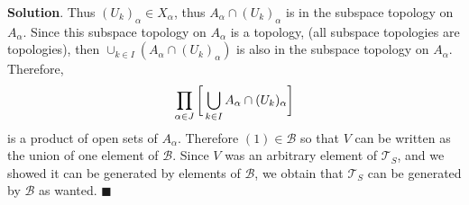 \documentclass[12pt]{article}
\renewcommand{\=}[1]{\stackrel{#1}{=}} %
\providecommand{\T}{\mathcal{T}}
\theoremstyle{definition}
\newenvironment{s}{%
        \begin{trivlist} \item \textbf{Solution}. }{%
            \hspace*{\fill} $\blacksquare$\end{trivlist}}%
\begin{document}
\begin{s}
    Thus $(U_k)_{\alpha}\in X_{\alpha}$, thus $A_{\alpha}\cap (U_k)_{\alpha}$ is in the subspace topology on $A_{\alpha}$. Since this subspace topology on $A_{\alpha}$
    is a topology, (all subspace topologies are topologies), then $\cup_{k\in I} (A_{\alpha}\cap (U_k)_{\alpha})$ is also in the subspace topology on $A_{\alpha}$.
    Therefore,
    \begin{align}
        \prod_{\alpha\in J} \bigg{[}\bigcup_{k\in I} A_{\alpha}\cap (U_k)_{\alpha}\bigg{]}
    \end{align}
    is a product of open sets of $A_{\alpha}$. Therefore $(1) \in \mathscr{B}$ so that $V$ can be written as the union of one element of $\mathscr{B}$. Since $V$
    was an arbitrary element of $\T_S$, and we showed it can be generated by elements of $\mathscr{B}$, we obtain that $\T_S$ can be generated by $\mathscr{B}$
    as wanted.
\end{s}
\end{document}
